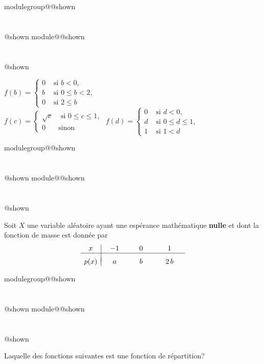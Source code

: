 \documentclass{Evaluation}
\makeatletter
\newcommand{\currentmodulekey}{}
\newcommand{\currentmoduletitle}{}
\newcommand{\currentgroupkey}{}
\newcommand{\currentgrouptitle}{}
\newcommand{\showmoduleifneeded}{%
  \ifx\currentgroupkey\empty\else
    \expandafter\ifx\csname modulegroup@\currentgroupkey @shown\endcsname\relax
      \section*{\currentgrouptitle}%
      \expandafter\gdef\csname modulegroup@\currentgroupkey @shown\endcsname{1}%
    \fi
  \fi
  \expandafter\ifx\csname module@\currentmodulekey @shown\endcsname\relax
    \section*{\currentmoduletitle}%
    \expandafter\gdef\csname module@\currentmodulekey @shown\endcsname{1}%
  \fi
}
\newenvironment{A23}{\showmoduleifneeded}{}
\newenvironment{H25}{\showmoduleifneeded}{}
\newenvironment{A25}{\showmoduleifneeded}{}
\makeatother
\begin{document}
\begin{questions}
\begin{A23}
\begin{checkboxes}
\correctchoice $ f(b) = \left\{
			\begin{array}{ll}
			0  & \mbox{ si } b<0, \\
			b & \mbox{ si } 0\leq b < 2,\\
			0 & \mbox{ si } 2 \leq b
			\end{array}
			\right. $\\
\choice $ f(c) = \left\{
			\begin{array}{ll}
			\sqrt{c}  & \mbox{ si } 0\leq c\leq 1, \\
			0 & \mbox{sinon}
			\end{array}
			\right. $
\choice $ f(d) = \left\{
			\begin{array}{ll}
			0  & \mbox{ si } d < 0, \\
			d & \mbox{ si } 0 \leq d \leq 1,\\
			1 &  \mbox{ si } 1 < d
			\end{array}
			\right. $
\end{checkboxes}
\end{A23}

\begin{H25}
\question {} %
Soit $X$ une variable aléatoire ayant une espérance mathématique \textbf{nulle} et dont la fonction de masse est donnée par
$$
\begin{array}{c|ccc}
x&-1&0&1\\\hline
&&&\\[-0.2cm]
p(x) &\;\;\;\;a\;\;\;\;&\;\;\;\;b\;\;\;\;&\;\;\;\;2\,b\;\;\;\;
\end{array}
$$
\end{H25}

\begin{A25}
\question {} %
Laquelle des fonctions suivantes est une fonction de répartition? 


\end{A25}
\end{questions}
\end{document}
